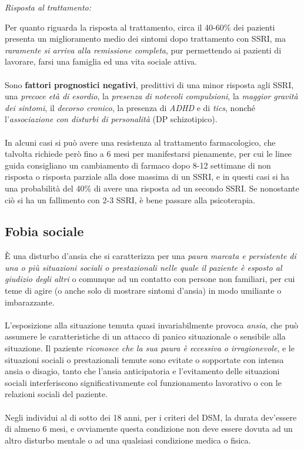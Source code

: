 \emph{\emph{Risposta al trattamento:}}

Per quanto riguarda la risposta al trattamento, circa il 40-60\% dei
pazienti presenta un miglioramento medio dei sintomi dopo trattamento
con SSRI, ma \emph{raramente si arriva alla remissione completa}, pur
permettendo ai pazienti di lavorare, farsi una famiglia ed una vita
sociale attiva.
\\\\
Sono \textbf{fattori prognostici negativi}, predittivi di una minor
risposta agli SSRI, una \emph{precoce età di esordio}, la \emph{presenza
di notevoli compulsioni}, la \emph{maggior gravità dei sintomi}, il
\emph{decorso cronico}, la presenza di \emph{ADHD} e di \emph{tics},
nonché l'\emph{associazione con disturbi di personalità} (DP
schizotipico).
\\\\
In alcuni casi si può avere una resistenza al trattamento farmacologico,
che talvolta richiede però fino a 6 mesi per manifestarsi pienamente,
per cui le linee guida consigliano un cambiamento di farmaco dopo 8-12
settimane di non risposta o risposta parziale alla dose massima di un
SSRI, e in questi casi si ha una probabilità del 40\% di avere una
risposta ad un secondo SSRI. Se nonostante ciò si ha un fallimento con
2-3 SSRI, è bene passare alla psicoterapia.

\subsection{Fobia sociale}

È una disturbo d'ansia che si caratterizza per una \emph{paura marcata e
persistente di una o più situazioni sociali o prestazionali nelle quale
il paziente è esposto al giudizio degli altri} o comunque ad un contatto
con persone non familiari, per cui teme di agire (o anche solo di
mostrare sintomi d'ansia) in modo umiliante o imbarazzante.
\\\\
L'esposizione alla situazione temuta quasi invariabilmente provoca
\emph{ansia}, che può assumere le caratteristiche di un attacco di
panico situazionale o sensibile alla situazione. Il paziente
\emph{riconosce che la sua paura è eccessiva o irragionevole}, e le
situazioni sociali o prestazionali temute sono evitate o sopportate con
intensa ansia o disagio, tanto che l'ansia anticipatoria e l'evitamento
delle situazioni sociali interferiscono significativamente col
funzionamento lavorativo o con le relazioni sociali del paziente.
\\\\
Negli individui al di sotto dei 18 anni, per i criteri del DSM, la
durata dev'essere di almeno 6 mesi, e ovviamente questa condizione non
deve essere dovuta ad un altro disturbo mentale o ad una qualsiasi
condizione medica o fisica.

